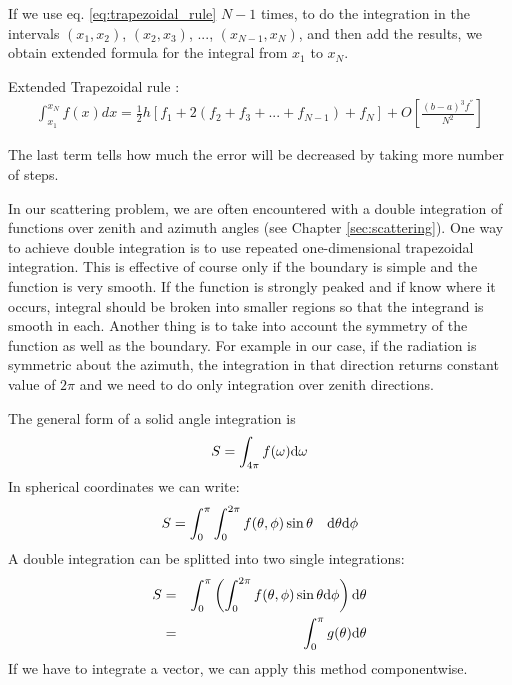 If we use eq. \ref{eq:trapezoidal_rule} $N - 1$ times, to do the
integration in the intervals $(x_1, x_2)$,  $(x_2, x_3)$, ...,
$(x_{N-1}, x_N)$, and then add the results, we obtain extended formula
for the integral from $x_1$ to $x_N$.

Extended Trapezoidal rule :
\begin{eqnarray}
\label{eq:ext_trapezoidal_rule}
{\int_{x_1}^{x_N} f(x)dx}  = \frac{1}{2} h \left [f_1 + 2(f_2 + f_3 +
... +f_{N-1})+f_N \right] + O\left [ \frac {(b-a)^3 f^{''}}{N^2} \right]
\end{eqnarray}

The last term tells how much the error will be decreased by taking
more number of steps. 

\label{sec:integration:solid_angle}
In our scattering problem, we are often encountered with a double integration
of functions over zenith and azimuth angles (see Chapter
\ref{sec:scattering}).  One way to achieve
double integration is to use repeated
one-dimensional trapezoidal integration.  This is effective of course
only if the boundary is simple and the function is very smooth.  If
the function is strongly peaked and if know where it occurs, integral
should be broken into smaller regions so that the 
integrand is smooth in each.  Another thing is to take into account
the symmetry of the function as well as the boundary. For example in
our case, if the radiation is symmetric about the azimuth, the
integration in that direction returns constant value of $2 \pi$ and we
need to do only integration over zenith directions.  

The general form of a solid angle integration is
\begin{equation}
  \label{eq:solid_int}
S = \int_{4\pi} f(\omega) \mathrm{d}\omega
\end{equation}
In spherical coordinates we can write:
\begin{equation}
  \label{eq:sol_int_sph}
 S = \int_0^\pi \int_0^{2\pi} f(\theta,\phi) \sin\theta \quad\mathrm{d}\theta\mathrm{d}\phi
\end{equation}
A double integration can be splitted into two single integrations:
\begin{eqnarray}
 S &=& \int_0^\pi \left(\int_0^{2\pi}  f(\theta,\phi) \sin\theta \mathrm{d}\phi \right) \mathrm{d}\theta \\
 &=& \int_0^\pi g(\theta) \mathrm{d}\theta
\end{eqnarray}
If we have to integrate a vector, we can apply this method componentwise.

